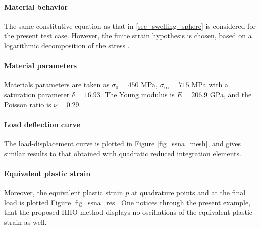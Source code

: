 \paragraph{Material behavior}

The same constitutive equation as that in \ref{sec_swelling_sphere} is considered for the present test case. 
However, the finite strain hypothesis is chosen, based on a logarithmic decomposition of the stress \cite{miehe_anisotropic_2002}.

\paragraph{Material parameters}

Materials parameters are taken as
$\sigma_0 = 450$ MPa, $\sigma_{\infty} = 715$ MPa with a saturation parameter $\delta = 16.93$. The Young modulus is $E = 206.9$ GPa, and the Poisson ratio is $\nu = 0.29$.

\paragraph{Load deflection curve}

The load-displacement curve is plotted
in Figure \ref{fig_ssna_mesh}, and gives similar results to that obtained with quadratic reduced integration elements.

\paragraph{Equivalent plastic strain}

Moreover, the equivalent
plastic strain $p$ at quadrature points and at the final load is plotted Figure \ref{fig_ssna_res}.
One notices through the present example, that the proposed HHO method displays no oscillations of the equivalent plastic strain as well.

